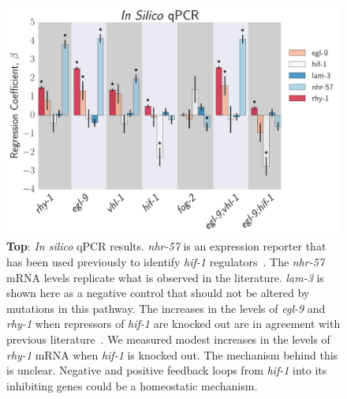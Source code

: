 \documentclass[9pt,twocolumn,twoside]{pnas-new}
\newcommand{\egl}{\emph{egl-9}}
\newcommand{\rhy}{\emph{rhy-1}}
\newcommand{\hif}{\emph{hif-1}}
\newcommand{\nhr}{\emph{nhr-57}}
\newcommand{\lam}{\emph{lam-3}}
\begin{document}
\begin{figure}[tbhp]
\centering
\includegraphics[width=\linewidth]{figs/qpcr.pdf}
\caption{
\textbf{Top}: \emph{In silico} qPCR results. \nhr{} is an expression
reporter that has been used previously to identify \hif{}
regulators~\cite{Shen2006,Shao2009}. The \nhr{} mRNA levels replicate what is
observed in the literature. \lam{} is shown here as a negative control that
should not be altered by mutations in this pathway. The increases in the levels
of \egl{} and \rhy{} when repressors of \hif{} are knocked out are in agreement
with previous literature~\cite{Powell-Coffman2010}. We measured modest increases
in the levels of \rhy{} mRNA when \hif{} is knocked out. The mechanism behind
this is unclear. Negative and positive feedback loops from \hif{} into its
inhibiting genes could be a homeostatic mechanism.
}
\label{fig:qpcr}
\end{figure}
\end{document}

